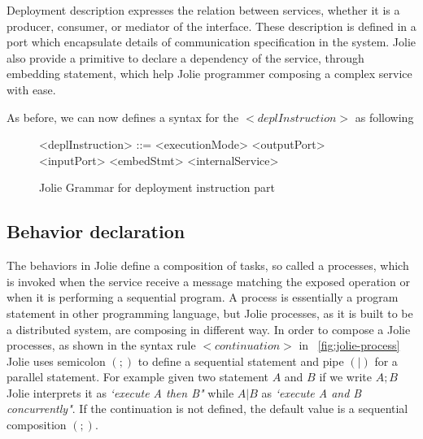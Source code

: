Deployment description expresses the relation between services, whether it is a producer, consumer, or mediator of the interface.
These description is defined in a port which encapsulate details of communication specification in the system.
Jolie also provide a primitive to declare a dependency of the service, through embedding statement, which help Jolie programmer composing a complex service with ease.








As before, we can now defines a syntax for the \(<deplInstruction>\) as following

\begin{figure}[h]
    \begin{framed}
        \begin{grammar}
            <deplInstruction> ::= <executionMode>
            \alt <outputPort>
            \alt <inputPort>
            \alt <embedStmt>
            \alt <internalService>
        \end{grammar}
    \end{framed}
    \caption{Jolie Grammar for deployment instruction part}
    \label{fig:jolie-depl}
\end{figure}


\subsection{Behavior declaration}
\label{sec:jolie-behavior}

The behaviors in Jolie define a composition of tasks, so called a processes, which is invoked when the service receive a message matching the exposed operation or when it is performing a sequential program. A process is essentially a program statement in other programming language, but Jolie processes, as it is built to be a distributed system, are composing in different way. In order to compose a Jolie processes, as shown in the syntax rule \(<continuation>\) in ~\ref{fig:jolie-process} Jolie uses semicolon \((;)\) to define a sequential statement and pipe \((|)\) for a parallel statement. For example given two statement \(A\) and \(B\) if we write \(A ; B\) Jolie interprets it as \textit{`execute A then B"} while \(A | B\) as \textit{`execute A and B concurrently"}. If the continuation is not defined, the default value is a sequential composition \((;)\).

